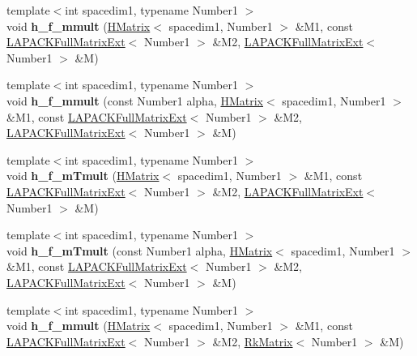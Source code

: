 \begin{DoxyCompactItemize}
\item 
\mbox{\label{classRkMatrix_a85ccef980f81f9fb3c63675f3f9c014f}} 
{\footnotesize template$<$int spacedim1, typename Number1 $>$ }\\void {\bfseries h\+\_\+f\+\_\+mmult} (\hyperlink{classHMatrix}{H\+Matrix}$<$ spacedim1, Number1 $>$ \&M1, const \hyperlink{classLAPACKFullMatrixExt}{L\+A\+P\+A\+C\+K\+Full\+Matrix\+Ext}$<$ Number1 $>$ \&M2, \hyperlink{classLAPACKFullMatrixExt}{L\+A\+P\+A\+C\+K\+Full\+Matrix\+Ext}$<$ Number1 $>$ \&M)
\item 
\mbox{\label{classRkMatrix_ab72731e18525c507f92b16d880858b93}} 
{\footnotesize template$<$int spacedim1, typename Number1 $>$ }\\void {\bfseries h\+\_\+f\+\_\+mmult} (const Number1 alpha, \hyperlink{classHMatrix}{H\+Matrix}$<$ spacedim1, Number1 $>$ \&M1, const \hyperlink{classLAPACKFullMatrixExt}{L\+A\+P\+A\+C\+K\+Full\+Matrix\+Ext}$<$ Number1 $>$ \&M2, \hyperlink{classLAPACKFullMatrixExt}{L\+A\+P\+A\+C\+K\+Full\+Matrix\+Ext}$<$ Number1 $>$ \&M)
\item 
\mbox{\label{classRkMatrix_adcedf4b5e2f14d085cce5cdc3f2b46cf}} 
{\footnotesize template$<$int spacedim1, typename Number1 $>$ }\\void {\bfseries h\+\_\+f\+\_\+m\+Tmult} (\hyperlink{classHMatrix}{H\+Matrix}$<$ spacedim1, Number1 $>$ \&M1, const \hyperlink{classLAPACKFullMatrixExt}{L\+A\+P\+A\+C\+K\+Full\+Matrix\+Ext}$<$ Number1 $>$ \&M2, \hyperlink{classLAPACKFullMatrixExt}{L\+A\+P\+A\+C\+K\+Full\+Matrix\+Ext}$<$ Number1 $>$ \&M)
\item 
\mbox{\label{classRkMatrix_a86eb2a4d2b7039163dd4f28650fe747e}} 
{\footnotesize template$<$int spacedim1, typename Number1 $>$ }\\void {\bfseries h\+\_\+f\+\_\+m\+Tmult} (const Number1 alpha, \hyperlink{classHMatrix}{H\+Matrix}$<$ spacedim1, Number1 $>$ \&M1, const \hyperlink{classLAPACKFullMatrixExt}{L\+A\+P\+A\+C\+K\+Full\+Matrix\+Ext}$<$ Number1 $>$ \&M2, \hyperlink{classLAPACKFullMatrixExt}{L\+A\+P\+A\+C\+K\+Full\+Matrix\+Ext}$<$ Number1 $>$ \&M)
\item 
\mbox{\label{classRkMatrix_aea3866052a5345742ad9f44f11f33989}} 
{\footnotesize template$<$int spacedim1, typename Number1 $>$ }\\void {\bfseries h\+\_\+f\+\_\+mmult} (\hyperlink{classHMatrix}{H\+Matrix}$<$ spacedim1, Number1 $>$ \&M1, const \hyperlink{classLAPACKFullMatrixExt}{L\+A\+P\+A\+C\+K\+Full\+Matrix\+Ext}$<$ Number1 $>$ \&M2, \hyperlink{classRkMatrix}{Rk\+Matrix}$<$ Number1 $>$ \&M)

\end{DoxyCompactItemize}
